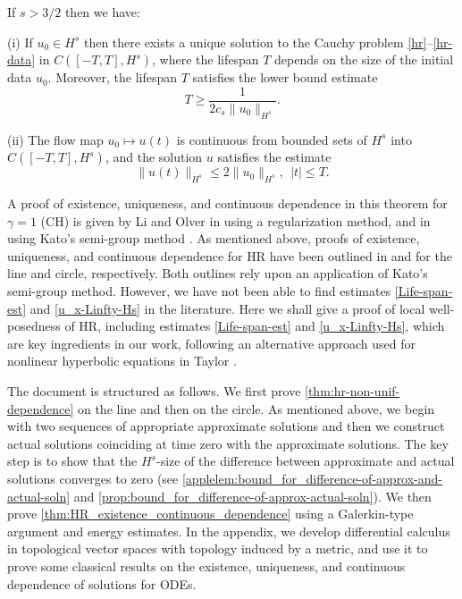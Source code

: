 %
%
%
%
%
%
\begin{theorem}
\label{thm:HR_existence_continuous_dependence}
If   $s>3/2$  then we have:

(i) If $u_0\in H^s$  then  there exists a unique solution to
the Cauchy problem  \eqref{hr}--\eqref{hr-data} in $C([-T, T], H^s)$, where 
the lifespan  $T$ depends on the size
of the initial data $u_0$. Moreover, 
the  lifespan $T$ satisfies the lower bound estimate 
%
%
%
\begin{equation}
\label{Life-span-est}
T
\ge
\frac{1}{2c_s \|u_0\|_{H^s}}.
\end{equation}
%

(ii)
The flow map $u_0 \mapsto u(t)$ is continuous from
bounded sets of $H^s$ into \\ $C([-T, T], H^s)$,
and the solution $u$ satisfies the estimate
%
%
%
\begin{equation}
\label{u_x-Linfty-Hs}
\|
u(t)
\|_ {H^s}
\le
2
\|
u_0
\|_{H^s}, \ \ |t|\le T.
\end{equation}
%
%
%
\end{theorem}
%
%
A proof of existence, uniqueness, and continuous dependence in this 
theorem for $\gamma =1$ (CH) 
is given  by Li and Olver in 
\cite{Li_2000_Well-posedness-} using a regularization method, and in
\cite{Rodriguez-Blanco_2001_On-the-Cauchy-p} using 
Kato's semi-group method \cite{Kato_1975_Quasi-linear-eq}. As mentioned 
above, proofs of 
existence, uniqueness, and continuous dependence for  HR
have been outlined in \cite{Yin_2003_On-the-Cauchy-p} and 
\cite{Zhou_2005_Local-well-pose} for the line and circle, 
respectively. Both outlines rely upon an application of Kato's semi-group 
method. However, we have not been able to find estimates  
\eqref{Life-span-est} and \eqref{u_x-Linfty-Hs}  in the literature.
Here we shall give a proof of local well-posedness of HR,
including  estimates \eqref{Life-span-est} and \eqref{u_x-Linfty-Hs},
which are key ingredients in our work, 
following an alternative approach used for nonlinear hyperbolic equations
in Taylor \cite{Taylor_1991_Pseudodifferent}.

The document is structured as follows. We first prove 
\cref{thm:hr-non-unif-dependence} on the line and 
then on the circle.
As mentioned above, we begin with two sequences of
appropriate approximate solutions and then 
we construct  actual solutions
coinciding at time zero  with the approximate solutions.
The key step is to show that  the $H^s$-size of
the difference between approximate and actual solutions 
converges to zero (see \cref{applelem:bound_for_difference-of-approx-and-actual-soln}
and \cref{prop:bound_for_difference-of-approx-actual-soln}). 
We then prove \cref{thm:HR_existence_continuous_dependence} 
using a Galerkin-type argument and energy estimates. In the appendix, we develop
differential calculus in topological vector spaces with topology induced by a
metric, and use it to prove some classical results on the existence, uniqueness,
and continuous dependence of solutions for ODEs.
%
%
%
%	
%
%
%
%
%
%
%
%
%
%
%
